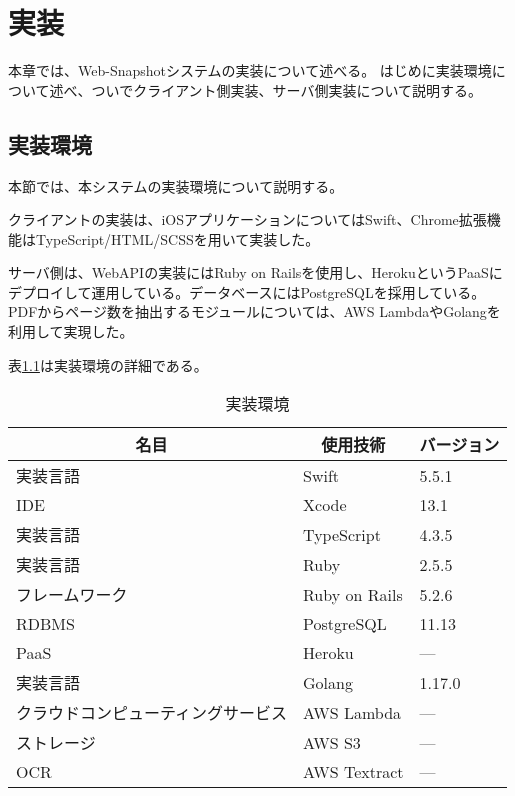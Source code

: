 \chapter{実装}
\label{chap:implementation}
本章では、Web-Snapshotシステムの実装について述べる。
はじめに実装環境について述べ、ついでクライアント側実装、サーバ側実装について説明する。

\section{実装環境}
本節では、本システムの実装環境について説明する。

クライアントの実装は、iOSアプリケーションについてはSwift、Chrome拡張機能はTypeScript/HTML/SCSSを用いて実装した。

サーバ側は、WebAPIの実装にはRuby on Railsを使用し、Heroku\cite{heroku}というPaaSにデプロイして運用している。データベースにはPostgreSQLを採用している。
PDFからページ数を抽出するモジュールについては、AWS Lambda\cite{lambda}やGolangを利用して実現した。

表\ref{tb:implementation-env}は実装環境の詳細である。

\begin{table}[htbp]
  \label{tb:implementation-env}
  \caption{実装環境}
  \begin{center}
    \begin{tabular}{|l|l|l|}
    \hline
    \multicolumn{1}{|c|}{\textbf{名目}} & \multicolumn{1}{|c|}{\textbf{使用技術}} & \multicolumn{1}{|c|}{\textbf{バージョン}} \\ \hline
    実装言語 & Swift & 5.5.1 \\ \hline
    IDE & Xcode & 13.1 \\ \hline
    実装言語 & TypeScript & 4.3.5 \\ \hline
    実装言語 & Ruby & 2.5.5 \\ \hline
    フレームワーク & Ruby on Rails & 5.2.6 \\ \hline
    RDBMS & PostgreSQL & 11.13 \\ \hline
    PaaS & Heroku & --- \\ \hline
    実装言語 & Golang & 1.17.0 \\ \hline
    クラウドコンピューティングサービス & AWS Lambda & --- \\ \hline
    ストレージ & AWS S3 & --- \\ \hline
    OCR & AWS Textract\cite{textract} & --- \\ \hline
    \end{tabular}
  \end{center}
\end{table}




